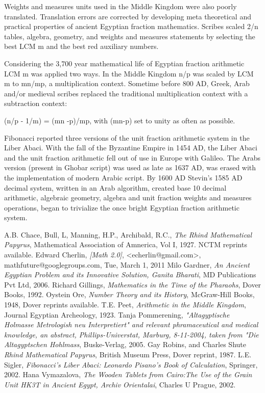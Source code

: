 \documentclass[12pt]{article}
\begin{document}
Weights and measures units used in the Middle Kingdom were also poorly translated. Translation errors are corrected by developing meta theoretical and practical properties of ancient Egyptian fraction mathematics. Scribes scaled 2/n tables, algebra, geometry, and weights and measures statements by selecting the best LCM m and the best red auxiliary numbers.

Considering the 3,700 year mathematical life of Egyptian fraction arithmetic LCM m was applied two ways. In the Middle Kingdom n/p was scaled by LCM m to mn/mp, a multiplication context. Sometime before 800 AD, Greek, Arab and/or medieval scribes replaced the traditional multiplication context with a subtraction context: 

(n/p - 1/m) = (mn -p)/mp, with (mn-p) set to unity as often as possible.   

Fibonacci reported three versions of the unit fraction arithmetic system in the Liber Abaci. With the fall of the Byzantine Empire in 1454 AD, the Liber Abaci and the unit fraction arithmetic fell out of use in Europe with Galileo. The Arabs version (present in Ghobar script) was used as late as 1637 AD, was erased with the implementation of modern Arabic script. By 1600 AD Stevin's 1585 AD decimal system, written in an Arab algorithm, created base 10 decimal arithmetic, algebraic geometry, algebra and unit fraction weights and measures operations, began to trivialize the once bright Egyptian fraction arithmetic system.  

\begin{thebibliography}{10}
  A.B. Chace, Bull, L, Manning, H.P., Archibald, R.C., \emph{The Rhind Mathematical Papyrus}, Mathematical Association of Amnerica, Vol I, 1927. NCTM reprints available.
 Edward Cherlin, \emph{ [Math 2.0]}, <echerlin@gmail.com>, mathfuture@googlegroups.com, Tue, March 1, 2011 
 Milo Gardner, \emph{An Ancient Egyptian Problem and its Innovative Solution, Ganita Bharati}, MD Publications Pvt Ltd, 2006.
Richard Gillings, \emph{Mathematics in the Time of the Pharaohs}, Dover Books, 1992.
 Oystein Ore, \emph{Number Theory and its History}, McGraw-Hill Books, 1948, Dover reprints available.
 T.E. Peet, \emph{Arithmetic in the Middle Kingdom}, Journal Egyptian Archeology, 1923.
 Tanja Pommerening, \emph{"Altagyptische Holmasse Metrologish neu Interpretiert" and relevant phramaceutical and medical knowledge, an abstract,  Phillips-Universtat, Marburg, 8-11-2004, taken from "Die Altagyptschen Hohlmass}, Buske-Verlag, 2005.
 Gay Robins, and Charles Shute \emph{Rhind Mathematical Papyrus}, British Museum Press, Dover reprint, 1987.
 L.E. Sigler, \emph{Fibonacci's Liber Abaci: Leonardo Pisano's Book of Calculation}, Springer, 2002.
 Hana Vymazalova, \emph{The Wooden Tablets from Cairo:The Use of the Grain Unit HK3T in Ancient Egypt, Archiv Orientalai}, Charles U Prague, 2002.
\end{thebibliography}




\end{document}
